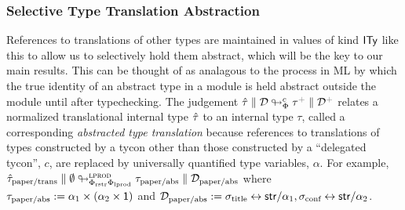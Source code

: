 \documentclass[10pt,preprint]{sigplanconf}
\newcommand{\moutput}{^{\color{gray}+}}
\begin{document}
\subsubsection{Selective Type Translation Abstraction}\label{sec:selective-type-translation-abstraction}
References to translations of other types are maintained in values of kind ${\sf ITy}$ like this to  allow us to selectively hold them abstract, which will be the key to our main results. This can be thought of as analagous to the process in ML by which the true identity of an abstract type in a module is held abstract outside the module until after typechecking. The judgement $\small\tdeabs{\Phi}{c}{\qity}{\memD}{\ity\moutput}{\memD\moutput}$ relates a normalized translational internal type $\hat{\tau}$ to an internal type $\tau$, called a corresponding \emph{abstracted type translation} because references to translations of types constructed by a tycon other than those constructed by a ``delegated tycon'', $c$, are replaced by universally quantified type variables, $\alpha$. For example, $\small\tdeabs{\Phi_\text{rstr}\Phi_\text{lprod}}{\tcvar{lprod}}{\qity_\text{paper/trans}}{\emptyset}{\tau_\text{paper/abs}}{\memD_\text{paper/abs}}$
where $\small\tau_\text{paper/abs} := \alpha_1 \times (\alpha_2 \times \iunit)$ and 
$\mathcal{D}_\text{paper/abs}  := \sigma_\text{title} \leftrightarrow {\sf str}/\alpha_1, \sigma_\text{conf} \leftrightarrow {\sf str}/\alpha_2$.
\end{document}
